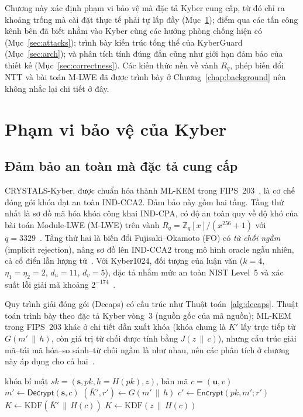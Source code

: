 \documentclass[../LuanVan.tex]{subfiles}
\begin{document}
 
Chương này xác định phạm vi bảo vệ mà đặc tả Kyber cung cấp, từ đó chỉ ra khoảng trống mà cài đặt thực tế phải tự lấp đầy (Mục~\ref{sec:scope}); điểm qua các tấn công kênh bên đã biết nhằm vào Kyber cùng các hướng phòng chống hiện có (Mục~\ref{sec:attacks}); trình bày kiến trúc tổng thể của KyberGuard (Mục~\ref{sec:arch}); và phân tích tính đúng đắn cũng như giới hạn đảm bảo của thiết kế (Mục~\ref{sec:correctness}). Các kiến thức nền về vành $R_q$, phép biến đổi NTT và bài toán M-LWE đã được trình bày ở Chương~\ref{chap:background} nên không nhắc lại chi tiết ở đây.
 
\section{Phạm vi bảo vệ của Kyber}
\label{sec:scope}
 
\subsection{Đảm bảo an toàn mà đặc tả cung cấp}
 
CRYSTALS-Kyber, được chuẩn hóa thành ML-KEM trong FIPS~203~\cite{FIPS203}, là cơ chế đóng gói khóa đạt an toàn IND-CCA2. Đảm bảo này gồm hai tầng. Tầng thứ nhất là sơ đồ mã hóa khóa công khai IND-CPA, có độ an toàn quy về độ khó của bài toán Module-LWE (M-LWE) trên vành $R_q=\mathbb{Z}_q[x]/(x^{256}+1)$ với $q=3329$~\cite{Avanzi21,LangloisStehle15}. Tầng thứ hai là biến đổi Fujisaki--Okamoto (FO) có \emph{từ chối ngầm} (implicit rejection), nâng sơ đồ lên IND-CCA2 trong mô hình oracle ngẫu nhiên, cả cổ điển lẫn lượng tử~\cite{fo1999,hhk2017}. Với Kyber1024, đối tượng của luận văn ($k=4$, $\eta_1=\eta_2=2$, $d_u=11$, $d_v=5$), đặc tả nhắm mức an toàn NIST Level~5 và xác suất lỗi giải mã khoảng $2^{-174}$~\cite{Avanzi21}.
 
Quy trình giải đóng gói (Decaps) có cấu trúc như Thuật toán~\ref{alg:decaps}. Thuật toán trình bày theo đặc tả Kyber vòng~3 (nguồn gốc của mã nguồn); ML-KEM trong FIPS~203 khác ở chi tiết dẫn xuất khóa (khóa chung là $K'$ lấy trực tiếp từ $G(m'\,\|\,h)$, còn giá trị từ chối được tính bằng $J(z\,\|\,c)$), nhưng cấu trúc giải mã--tái mã hóa--so sánh--từ chối ngầm là như nhau, nên các phân tích ở chương này áp dụng cho cả hai~\cite{FIPS203,Avanzi21}.
 
\begin{algorithm}[H]
\caption{Giải đóng gói CCA của Kyber}
\label{alg:decaps}
\begin{algorithmic}[1]
\Require khóa bí mật $sk=(\mathbf{s},pk,h=H(pk),z)$, bản mã $c=(\mathbf{u},v)$
\State $m' \gets \mathsf{Decrypt}(\mathbf{s},c)$ 
\State $(\overline{K}',r') \gets G(m'\,\|\,h)$
\State $c' \gets \mathsf{Encrypt}(pk,m';r')$ 
  \State \Return $K \gets \mathrm{KDF}(\overline{K}'\,\|\,H(c))$
\Else
  \State \Return $K \gets \mathrm{KDF}(z\,\|\,H(c))$ 
\EndIf
\end{algorithmic}
\end{algorithm}
 
\end{document}
